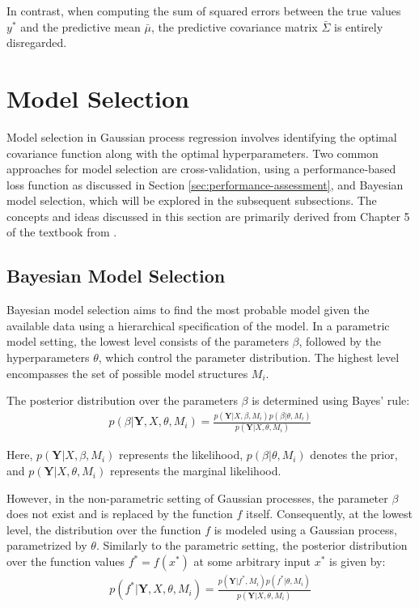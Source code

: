 In contrast, when computing the sum of squared errors between the true values $y^{\ast}$ and the predictive mean $\bar{\mu}$,
the predictive covariance matrix $\bar{\Sigma}$ is entirely disregarded.



\section{Model Selection}

Model selection in Gaussian process regression involves identifying the optimal covariance function
along with the optimal hyperparameters.
Two common approaches for model selection are cross-validation, using a performance-based loss
function as discussed in Section \ref{sec:performance-assessment}, and Bayesian model selection,
which will be explored in the subsequent subsections.
The concepts and ideas discussed in this section are primarily derived from Chapter 5 of
the textbook from \citeauthor{rasmussen_gaussian_2006}.

\subsection{Bayesian Model Selection}

Bayesian model selection aims to find the most probable model given the available data
using a hierarchical specification of the model.
In a parametric model setting, the lowest level consists of the parameters $\beta$,
followed by the hyperparameters $\theta$, which control the parameter distribution.
The highest level encompasses the set of possible model structures $M_i$.

The posterior distribution over the parameters $\beta$ is determined using Bayes' rule:
\begin{gather*}
    p(\beta | \mathbf{Y}, X, \theta, M_i) = \frac{p( \mathbf{Y}| X, \beta,
        M_i)p(\beta|\theta, M_i)}{p(\mathbf{Y}|X, \theta, M_i)}
\end{gather*}

Here, $p(\mathbf{Y} | X, \beta, M_i)$ represents the likelihood, $p(\beta | \theta, M_i)$ denotes the prior,
and $p(\mathbf{Y} | X, \theta, M_i)$ represents the marginal likelihood.


However, in the non-parametric setting of Gaussian processes, the parameter $\beta$ does not exist and is
replaced by the function $f$ itself.
Consequently, at the lowest level, the distribution over the function $f$ is modeled using a Gaussian process,
parametrized by $\theta$.
Similarly to the parametric setting, the posterior distribution over the function values
$f^{\ast} = f(x^{\ast})$ at some arbitrary input $x^{\ast}$ is given by:
\begin{gather*}
    p(f^{\ast} | \mathbf{Y}, X, \theta, M_i) = \frac{p( \mathbf{Y}| f^{\ast}, M_i)p(f^{\ast} | \theta, M_i)}{p(\mathbf{Y}|X, \theta, M_i)}
\end{gather*}

